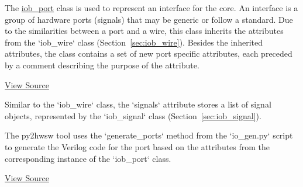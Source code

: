 %

%
%

The \href{https://github.com/IObundle/py2hwsw/blob/main/py2hwsw/scripts/iob_port.py}{iob\_port} class is used to represent an interface for the core.
An interface is a group of hardware ports (signals) that may be generic or follow a standard.
Due to the similarities between a port and a wire, this class inherits the attributes from the `iob\_wire` class (Section~\ref{sec:iob_wire}).
Besides the inherited attributes, the class contains a set of new port specific attributes, each preceded by a comment describing the purpose of the attribute.


\href{https://github.com/IObundle/py2hwsw/blob/main/py2hwsw/scripts/iob_port.py}{View Source}

Similar to the `iob\_wire` class, the `signals` attribute stores a list of signal objects, represented by the `iob\_signal` class  (Section~\ref{sec:iob_signal}).

%
%

The py2hwsw tool uses the `generate\_ports` method from the `io\_gen.py` script to generate the Verilog code for the port based on the attributes from the corresponding instance of the `iob\_port` class.


\href{https://github.com/IObundle/py2hwsw/blob/main/py2hwsw/scripts/io_gen.py}{View Source}
